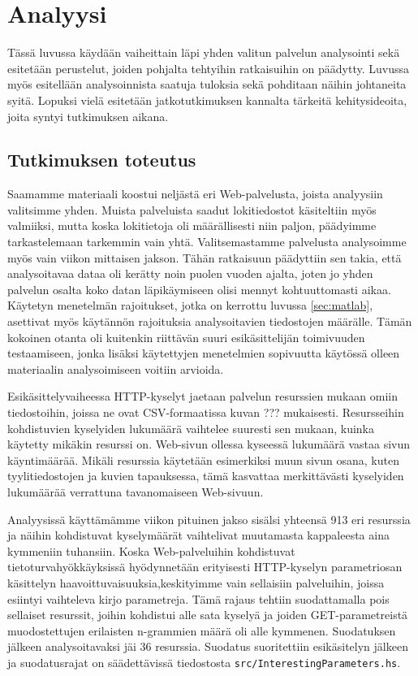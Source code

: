 
\chapter{Analyysi}

Tässä luvussa käydään vaiheittain läpi yhden valitun palvelun analysointi sekä esitetään perustelut, joiden pohjalta tehtyihin ratkaisuihin on päädytty. 
Luvussa myös esitellään analysoinnista saatuja tuloksia sekä pohditaan näihin johtaneita syitä. Lopuksi vielä esitetään jatkotutkimuksen kannalta 
tärkeitä kehitysideoita, joita syntyi tutkimuksen aikana. 
 
\section{Tutkimuksen toteutus}

Saamamme materiaali koostui neljästä eri Web-palvelusta, joista analyysiin valitsimme yhden. Muista palveluista saadut lokitiedostot käsiteltiin
myös valmiiksi, mutta koska lokitietoja oli määrällisesti niin paljon, päädyimme tarkastelemaan tarkemmin vain yhtä. Valitsemastamme palvelusta
analysoimme myös vain viikon mittaisen jakson. Tähän ratkaisuun päädyttiin sen takia, että analysoitavaa dataa oli kerätty noin puolen vuoden ajalta,
joten jo yhden palvelun osalta koko datan läpikäymiseen olisi mennyt kohtuuttomasti aikaa. Käytetyn menetelmän rajoitukset, jotka on kerrottu luvussa \ref{sec:matlab},
asettivat myös käytännön rajoituksia analysoitavien tiedostojen määrälle. Tämän kokoinen otanta oli kuitenkin riittävän suuri esikäsittelijän toimivuuden
testaamiseen, jonka lisäksi käytettyjen menetelmien sopivuutta käytössä olleen materiaalin analysoimiseen voitiin arvioida. 

Esikäsittelyvaiheessa HTTP-kyselyt jaetaan palvelun resurssien mukaan
omiin tiedostoihin, joissa ne ovat CSV-formaatissa kuvan ???
mukaisesti.  Resursseihin kohdistuvien kyselyiden lukumäärä vaihtelee
suuresti sen mukaan, kuinka käytetty mikäkin resurssi on. Web-sivun
ollessa kyseessä lukumäärä vastaa sivun käyntimäärää. Mikäli resurssia
käytetään esimerkiksi muun sivun osana, kuten tyylitiedostojen ja
kuvien tapauksessa, tämä kasvattaa merkittävästi kyselyiden lukumäärää
verrattuna tavanomaiseen Web-sivuun.

Analyysissä käyttämämme viikon pituinen jakso sisälsi yhteensä 913 eri
resurssia ja näihin kohdistuvat kyselymäärät vaihtelivat muutamasta
kappaleesta aina kymmeniin tuhansiin. Koska Web-palveluihin kohdistuvat 
tietoturvahyökkäyksissä hyödynnetään erityisesti HTTP-kyselyn parametriosan 
käsittelyn haavoittuvaisuuksia,keskityimme vain sellaisiin palveluihin, joissa 
esiintyi vaihteleva kirjo parametreja. Tämä rajaus tehtiin suodattamalla pois sellaiset
resurssit, joihin kohdistui alle sata kyselyä ja joiden
GET-parametreistä muodostettujen erilaisten n-grammien määrä oli alle
kymmenen. Suodatuksen jälkeen analysoitavaksi jäi 36
resurssia. Suodatus suoritettiin esikäsitelyn jälkeen ja
suodatusrajat on säädettävissä tiedostosta
\texttt{src/InterestingParameters.hs}.


